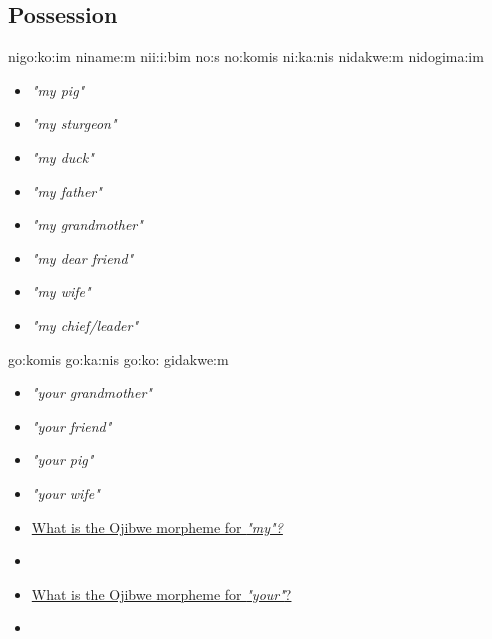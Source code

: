 \documentclass[a4paper,11pt]{article}
\begin{document}
\pagebreak
\subsection{Possession}

\begin{multicols}{2}
\begin{exe}
\ex nigo:ko:im 
\ex niname:m 
\ex ni{\textyogh}i:i:bim 
\ex no:s 
\ex no:komis 
\ex ni:ka:nis 
\ex nidakwe:m 
\ex nidogima:im 
\end{exe}
\columnbreak
\begin{itemize}
\item[] \textit{"my pig"}
\item[] \textit{"my sturgeon"}
\item[] \textit{"my duck"}
\item[] \textit{"my father"}
\item[] \textit{"my grandmother"}
\item[] \textit{"my dear friend"}
\item[] \textit{"my wife"}
\item[] \textit{"my chief/leader"}
\end{itemize}
\end{multicols}


\begin{multicols}{2}
\begin{exe}
\ex go:komis 
\ex go:ka:nis
\ex go:ko: 
\ex gidakwe:m 
\end{exe}
\columnbreak
\begin{itemize}
\item[] \textit{"your grandmother"}
\item[] \textit{"your friend"}
\item[] \textit{"your pig"}
\item[] \textit{"your wife"}
\end{itemize}
\end{multicols}

\vspace{1cm}
\begin{itemize}
\item \underline{What is the Ojibwe morpheme for \textit{"my"?}}
\item[] 
\item \underline{What is the Ojibwe morpheme for \textit{"your"}?}
\item[] 
\end{itemize}
\end{document}
